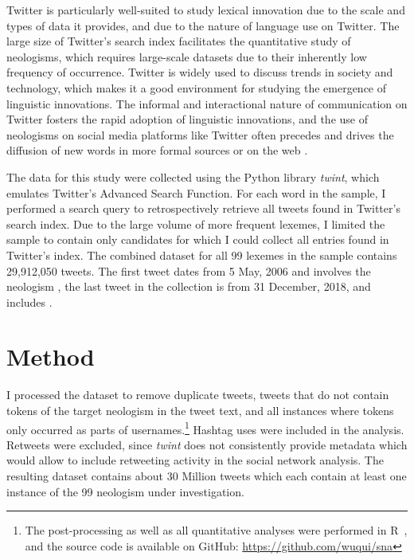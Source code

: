\documentclass[
  a4paper,
  abstract=on,
  captions=tableabove
  ]{scrartcl}
\begin{document}
    Twitter is particularly well-suited to study lexical innovation due to the scale and types of data it provides, and due to the nature of language use on Twitter. The large size of Twitter's search index facilitates the quantitative study of neologisms, which requires large-scale datasets due to their inherently low frequency of occurrence. Twitter is widely used to discuss trends in society and technology, which makes it a good environment for studying the emergence of linguistic innovations. The informal and interactional nature of communication on Twitter fosters the rapid adoption of linguistic innovations, and the use of neologisms on social media platforms like Twitter often precedes and drives the diffusion of new words in more formal sources or on the web \parencite{Wurschinger2016UsingWeb}.

    The data for this study were collected using the Python library \emph{twint}, which emulates Twitter's Advanced Search Function. For each word in the sample, I performed a search query to retrospectively retrieve all tweets found in Twitter's search index. Due to the large volume of more frequent lexemes, I limited the sample to contain only candidates for which I could collect all entries found in Twitter's index. The combined dataset for all 99 lexemes in the sample contains 29,912,050 tweets. The first tweet dates from 5 May, 2006 and involves the neologism , the last tweet in the collection is from 31 December, 2018, and includes .

\section{Method}
  \label{sec:method}

  I processed the dataset to remove duplicate tweets, tweets that do not contain tokens of the target neologism in the tweet text, and all instances where tokens only occurred as parts of usernames.\footnote{The post-processing as well as all quantitative analyses were performed in R~\parencite{RCoreTeam2018LanguageEnvironment}, and the source code is available on GitHub: \url{https://github.com/wuqui/sna}} Hashtag uses were included in the analysis. Retweets were excluded, since \emph{twint} does not consistently provide metadata which would allow to include retweeting activity in the social network analysis. The resulting dataset contains about 30 Million tweets which each contain at least one instance of the 99 neologism under investigation.
\end{document}
